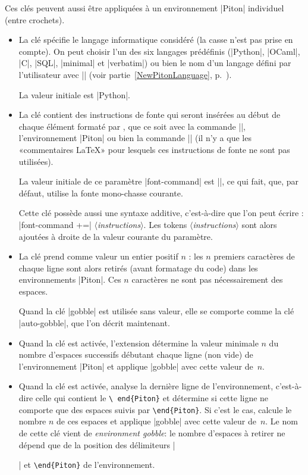 \documentclass[dvipsnames,svgnames]{article}
\begin{document}
Ces clés peuvent aussi être appliquées à un environnement |{Piton}| individuel (entre
crochets).

\begin{itemize}
\item La clé  spécifie le langage informatique considéré (la casse
n'est pas prise en compte). On peut choisir l'un des six langages prédéfinis (|Python|,
|OCaml|, |C|, |SQL|, |minimal| et |verbatim|) ou bien le nom d'un langage défini par
l'utilisateur avec |\NewPitonLanguage| (voir partie~\ref{NewPitonLanguage},
p.~\pageref{NewPitonLanguage}). 

La valeur initiale est |Python|.

\item {} La clé  contient des
instructions de fonte qui seront insérées au début de chaque élément formaté par
, que ce soit avec la commande |\piton|, l'environnement |{Piton}| ou
bien la commande |\PitonInputFile| (il n'y a que les «commentaires LaTeX» pour
lesquels ces instructions de fonte ne sont pas utilisées).

La valeur initiale de ce paramètre |font-command| est |\ttfamily|, ce qui fait,
que, par défaut,  utilise la fonte mono-chasse courante.

Cette clé possède aussi une syntaxe additive, c'est-à-dire que l'on peut
écrire : |font-command +=| $\langle$\textsl{instructions}$\rangle$. Les
tokens $\langle$\textsl{instructions}$\rangle$ sont alors ajoutées à droite
de la valeur courante du paramètre.


\item {}\label{gobble} La clé  prend comme valeur
un entier positif $n$ : les $n$ premiers caractères de chaque ligne sont alors
retirés (avant formatage du code) dans les environnements |{Piton}|. Ces $n$
caractères ne sont pas nécessairement des espaces.

Quand la clé |gobble| est utilisée sans valeur, elle se comporte comme la clé
|auto-gobble|, que l'on décrit maintenant.

\item {} Quand la clé
 est activée, l'extension  détermine la
valeur minimale $n$ du nombre d'espaces successifs débutant chaque ligne (non
vide) de l'environnement |{Piton}| et applique |gobble| avec cette valeur
de~$n$.

\item {} Quand la clé
 est activée,  analyse la dernière ligne de
l'environnement, c'est-à-dire celle qui contient le \texttt{\textbackslash
  end\{Piton\}} et détermine si cette ligne ne comporte que des espaces suivis
par \texttt{\textbackslash end\{Piton\}}. Si c'est le cas,  calcule
le nombre $n$ de ces espaces et applique |gobble| avec cette valeur de~$n$. Le
nom de cette clé vient de \emph{environment gobble}: le nombre d'espaces à
retirer ne dépend que de la position des délimiteurs |\begin{Piton}| et
\texttt{\textbackslash end\{Piton\}} de l'environnement.



\end{Piton}
\end{itemize}
\end{document}
